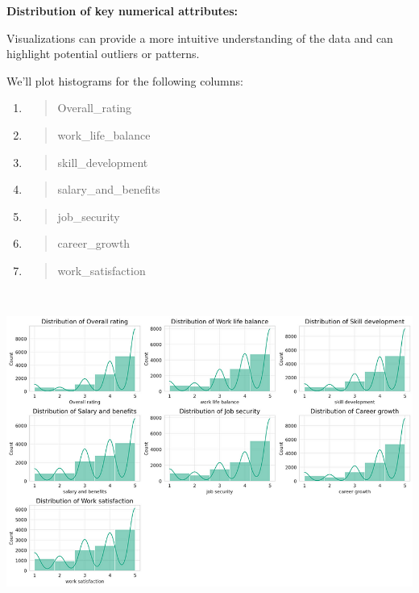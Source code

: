 \documentclass[
]{article}
\begin{document}
\textbf{Distribution of key numerical attributes:}

Visualizations can provide a more intuitive understanding of the data
and can highlight potential outliers or patterns.

We'll plot histograms for the following columns:

\begin{enumerate}
\def\labelenumi{\arabic{enumi}.}
\item
  \begin{quote}
  Overall\_rating
  \end{quote}
\item
  \begin{quote}
  work\_life\_balance
  \end{quote}
\item
  \begin{quote}
  skill\_development
  \end{quote}
\item
  \begin{quote}
  salary\_and\_benefits
  \end{quote}
\item
  \begin{quote}
  job\_security
  \end{quote}
\item
  \begin{quote}
  career\_growth
  \end{quote}
\item
  \begin{quote}
  work\_satisfaction
  \end{quote}
\end{enumerate}

\includegraphics[width=5.26806in,height=4.16944in]{image3.png}
\end{document}
